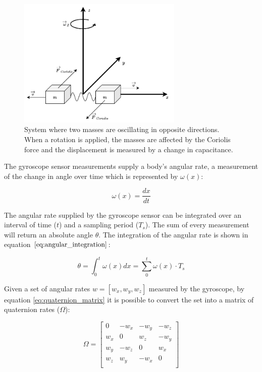 \begin{figure}[!h]
    \centering
    \includegraphics[width=0.7\textwidth]{figures/coriolis.pdf}
    \caption{ System where two masses are oscillating in opposite directions. When a rotation is applied, the masses are affected by the Coriolis force and the displacement is measured by a change in capacitance.}
    \label{fig:coriolis}
\end{figure}

The gyroscope sensor measurements supply a body's angular rate, a measurement of the change in angle over time which is represented by $\omega(x)$:

\begin{equation}
    \omega(x) = \frac{dx}{dt}
\end{equation}

The angular rate supplied by the gyroscope sensor can be integrated over an interval of time ($t$) and a sampling period ($T_s$). The sum of every measurement will return an absolute angle $\theta$. The integration of the angular rate is shown in equation $\ref{eq:angular_integration}$:

\begin{equation}
    \theta = \int_{0}^{t} \omega(x) dx = \sum_{0}^{t} \omega(x)\cdot T_s
    \label{eq:angular_integration}
\end{equation}

Given a set of angular rates $w=[w_x,w_y,w_z]$ measured by the gyroscope, by equation \ref{eq:quaternion_matrix} it is possible to convert the set into a matrix of quaternion rates ($\Omega$):

\begin{equation}
    \Omega = \begin{bmatrix}
        0   & -w_x & -w_y & -w_z \\
        w_x & 0    & w_z  & -w_y \\
        w_y & -w_z & 0    & w_x  \\
        w_z & w_y  & -w_x & 0    \\
    \end{bmatrix}
\end{equation}


